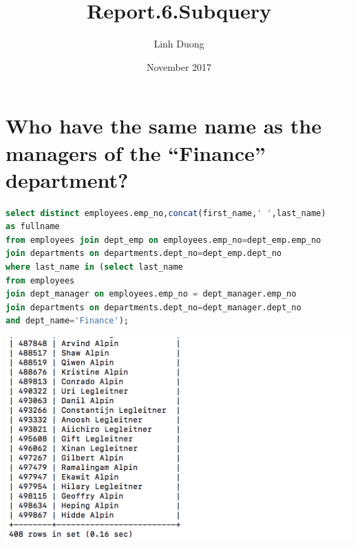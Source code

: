 \documentclass{article}
\title{Report.6.Subquery}
\author{Linh Duong}
\date{November 2017}
\begin{document}
\maketitle

\section{Who have the same name as the managers of the “Finance” department?}
\begin{lstlisting}[language=sql]
select distinct employees.emp_no,concat(first_name,' ',last_name) 
as fullname
from employees join dept_emp on employees.emp_no=dept_emp.emp_no 
join departments on departments.dept_no=dept_emp.dept_no
where last_name in (select last_name 
from employees 
join dept_manager on employees.emp_no = dept_manager.emp_no
join departments on departments.dept_no=dept_manager.dept_no 
and dept_name='Finance');
\end{lstlisting}
\includegraphics[width=\linewidth]{1.png}
\end{document}
